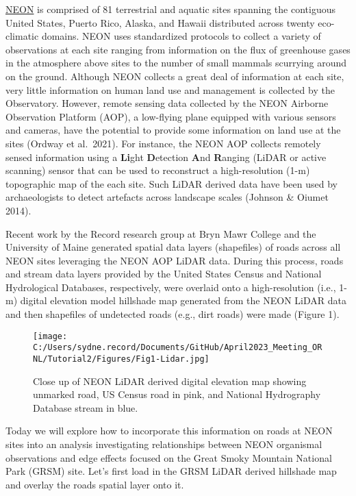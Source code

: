 \documentclass[
]{article}
\begin{document}
\href{https://www.neonscience.org/}{NEON} is comprised of 81 terrestrial
and aquatic sites spanning the contiguous United States, Puerto Rico,
Alaska, and Hawaii distributed across twenty eco-climatic domains. NEON
uses standardized protocols to collect a variety of observations at each
site ranging from information on the flux of greenhouse gases in the
atmosphere above sites to the number of small mammals scurrying around
on the ground. Although NEON collects a great deal of information at
each site, very little information on human land use and management is
collected by the Observatory. However, remote sensing data collected by
the NEON Airborne Observation Platform (AOP), a low-flying plane
equipped with various sensors and cameras, have the potential to provide
some information on land use at the sites (Ordway et al.~2021). For
instance, the NEON AOP collects remotely sensed information using a
\textbf{Li}ght \textbf{D}etection \textbf{A}nd \textbf{R}anging (LiDAR
or active scanning) sensor that can be used to reconstruct a
high-resolution (1-m) topographic map of the each site. Such LiDAR
derived data have been used by archaeologists to detect artefacts across
landscape scales (Johnson \& Oiumet 2014).

Recent work by the Record research group at Bryn Mawr College and the
University of Maine generated spatial data layers (shapefiles) of roads
across all NEON sites leveraging the NEON AOP LiDAR data. During this
process, roads and stream data layers provided by the United States
Census and National Hydrological Databases, respectively, were overlaid
onto a high-resolution (i.e., 1-m) digital elevation model hillshade map
generated from the NEON LiDAR data and then shapefiles of undetected
roads (e.g., dirt roads) were made (Figure 1).

\begin{figure}
\centering
\texttt{[image: C:/Users/sydne.record/Documents/GitHub/April2023\_Meeting\_ORNL/Tutorial2/Figures/Fig1-Lidar.jpg]}
\caption{Close up of NEON LiDAR derived digital elevation map showing
unmarked road, US Census road in pink, and National Hydrography Database
stream in blue.}
\end{figure}

Today we will explore how to incorporate this information on roads at
NEON sites into an analysis investigating relationships between NEON
organismal observations and edge effects focused on the Great Smoky
Mountain National Park (GRSM) site. Let's first load in the GRSM LiDAR
derived hillshade map and overlay the roads spatial layer onto it.
\end{document}
